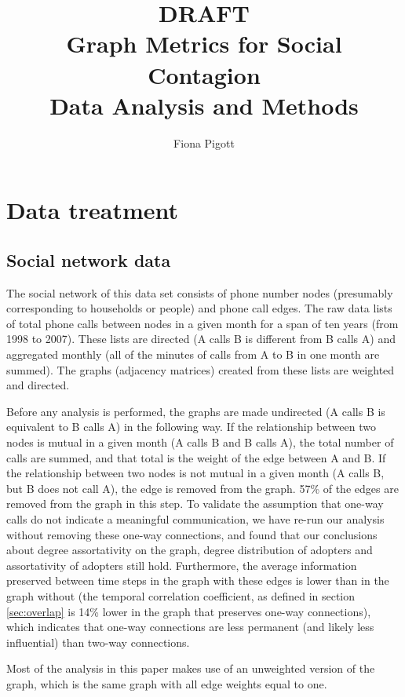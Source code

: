 \documentclass[12pt]{article}
\title{DRAFT \\ Graph Metrics for Social Contagion \\ Data Analysis and Methods}
\author{Fiona Pigott}
\begin{document}
\maketitle

\section{Data treatment}

\subsection{Social network data}

The social network of this data set consists of phone number nodes (presumably corresponding to households or people) and phone call edges. The raw data lists of total phone calls between nodes in a given month for a span of ten years (from 1998 to 2007). These lists are directed (A calls B is different from B calls A) and aggregated monthly (all of the minutes of calls from A to B in one month are summed). The graphs (adjacency matrices) created from these lists are weighted and directed.

Before any analysis is performed, the graphs are made undirected (A calls B is equivalent to B calls A) in the following way. If the relationship between two nodes is mutual in a given month (A calls B and B calls A), the total number of calls are summed, and that total is the weight of the edge between A and B. If the relationship between two nodes is not mutual in a given month (A calls B, but B does not call A), the edge is removed from the graph. 57\% of the edges are removed from the graph in this step. To validate the assumption that one-way calls do not indicate a meaningful communication, we have re-run our analysis without removing these one-way connections, and found that our conclusions about degree assortativity on the graph, degree distribution of adopters and assortativity of adopters still hold. Furthermore, the average information preserved between time steps in the graph with these edges is lower than in the graph without (the temporal correlation coefficient, as defined in section \ref{sec:overlap} is 14\% lower in the graph that preserves one-way connections), which indicates that one-way connections are less permanent (and likely less influential) than two-way connections. 

Most of the analysis in this paper makes use of an unweighted version of the graph, which is the same graph with all edge weights equal to one.
\end{document}
